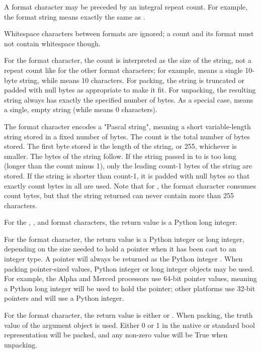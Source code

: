 A format character may be preceded by an integral repeat count.  For
example, the format string  means exactly the same as
.

Whitespace characters between formats are ignored; a count and its
format must not contain whitespace though.

For the  format character, the count is interpreted as the
size of the string, not a repeat count like for the other format
characters; for example,  means a single 10-byte string, while
 means 10 characters.  For packing, the string is
truncated or padded with null bytes as appropriate to make it fit.
For unpacking, the resulting string always has exactly the specified
number of bytes.  As a special case,  means a single, empty
string (while  means 0 characters).

The  format character encodes a "Pascal string", meaning
a short variable-length string stored in a fixed number of bytes.
The count is the total number of bytes stored.  The first byte stored is
the length of the string, or 255, whichever is smaller.  The bytes
of the string follow.  If the string passed in to  is too
long (longer than the count minus 1), only the leading count-1 bytes of the
string are stored.  If the string is shorter than count-1, it is padded
with null bytes so that exactly count bytes in all are used.  Note that
for , the  format character consumes count
bytes, but that the string returned can never contain more than 255
characters.

For the , ,  and 
format characters, the return value is a Python long integer.

For the  format character, the return value is a Python
integer or long integer, depending on the size needed to hold a
pointer when it has been cast to an integer type.  A \NULL{} pointer will
always be returned as the Python integer . When packing pointer-sized
values, Python integer or long integer objects may be used.  For
example, the Alpha and Merced processors use 64-bit pointer values,
meaning a Python long integer will be used to hold the pointer; other
platforms use 32-bit pointers and will use a Python integer.

For the  format character, the return value is either
 or . When packing, the truth value
of the argument object is used. Either 0 or 1 in the native or standard
bool representation will be packed, and any non-zero value will be True
when unpacking.

